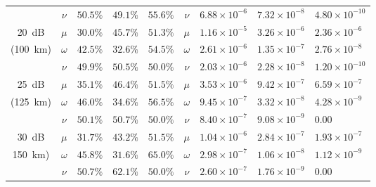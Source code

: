 \begin{table}[p]
\begin{tabular}{cclllclll}
        & $\nu$        & $50.5\%$                  & $49.1\%$                  & $55.6\%$                  & $\nu$        & $6.88\times10^{-6}$     & $7.32\times10^{-8}$     & $4.80\times10^{-10}$     \vspace{5pt}\\
\SI{20}{dB}   &  $\mu$        & $30.0\%$                  & $45.7\%$                  & $51.3\%$                  & $\mu$        & $1.16\times10^{-5}$     & $3.26\times10^{-6}$     & $2.36\times10^{-6}$     \\
(\SI{100}{\km}) & $\omega$        & $42.5\%$                  & $32.6\%$                  & $54.5\%$                  & $\omega$        & $2.61\times10^{-6}$     & $1.35\times10^{-7}$     & $2.76\times10^{-8}$     \\
        & $\nu$        & $49.9\%$                  & $50.5\%$                  & $50.0\%$                  & $\nu$        & $2.03\times10^{-6}$     & $2.28\times10^{-8}$     & $1.20\times10^{-10}$    \vspace{5pt}\\
        \SI{25}{dB}  & $\mu$        & $35.1\%$                  & $46.4\%$                  & $51.5\%$                  & $\mu$        & $3.53\times10^{-6}$     & $9.42\times10^{-7}$     & $6.59\times10^{-7}$     \\
(\SI{125}{\km}) & $\omega$        & $46.0\%$                  & $34.6\%$                  & $56.5\%$                  & $\omega$        & $9.45\times10^{-7}$     & $3.32\times10^{-8}$     & $4.28\times10^{-9}$\\
        & $\nu$        & $50.1\%$                  & $50.7\%$                  & $50.0\%$                  & $\nu$        & $8.40\times10^{-7}$     & $9.08\times10^{-9}$     & $0.00$     \vspace{5pt}\\
\SI{30}{dB} & $\mu$        & $31.7\%$                  & $43.2\%$                  & $51.5\%$                  & $\mu$        & $1.04\times10^{-6}$     & $2.84\times10^{-7}$     & $1.93\times10^{-7}$     \\
\SI{150}{\km}) & $\omega$        & $45.8\%$                  & $31.6\%$                  & $65.0\%$                  & $\omega$        & $2.98\times10^{-7}$     & $1.06\times10^{-8}$     & $1.12\times10^{-9}$     \\
        & $\nu$        & $50.7\%$                  & $62.1\%$                  & $50.0\%$                  & $\nu$        & $2.60\times10^{-7}$     & $1.76\times10^{-9}$     & $0.00$                  \vspace{5pt}\\

\end{tabular}
\end{table}

